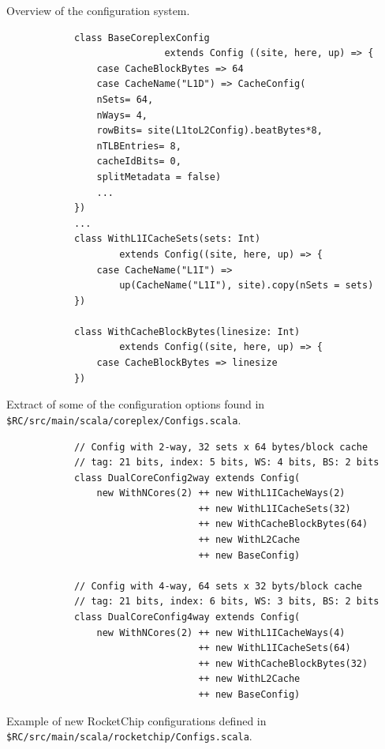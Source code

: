 \documentclass[journal,a4paper]{IEEEtran}
\begin{document}
\begin{table}
	\caption{Overview of the configuration system.}
	\begin{subtable}[b]{0.9\linewidth}
		\begin{verbatim}
			class BaseCoreplexConfig
							extends Config ((site, here, up) => {
				case CacheBlockBytes => 64
				case CacheName("L1D") => CacheConfig(
				nSets= 64,
				nWays= 4,
				rowBits= site(L1toL2Config).beatBytes*8,
				nTLBEntries= 8,
				cacheIdBits= 0,
				splitMetadata = false)
				...
			})
			...
			class WithL1ICacheSets(sets: Int)
					extends Config((site, here, up) => {
				case CacheName("L1I") =>
					up(CacheName("L1I"), site).copy(nSets = sets)
			})

			class WithCacheBlockBytes(linesize: Int)
					extends Config((site, here, up) => {
				case CacheBlockBytes => linesize
			})
		\end{verbatim}
		\caption{Extract of some of the configuration options found in \texttt{\$RC/src/main/scala/coreplex/Configs.scala}.}
		\label{config-options}
	\end{subtable}
	\begin{subtable}[b]{0.9\linewidth}
		\begin{verbatim}
			// Config with 2-way, 32 sets x 64 bytes/block cache
			// tag: 21 bits, index: 5 bits, WS: 4 bits, BS: 2 bits
			class DualCoreConfig2way extends Config(
				new WithNCores(2) ++ new WithL1ICacheWays(2)
				                  ++ new WithL1ICacheSets(32)
				                  ++ new WithCacheBlockBytes(64)
				                  ++ new WithL2Cache
				                  ++ new BaseConfig)

			// Config with 4-way, 64 sets x 32 byts/block cache
			// tag: 21 bits, index: 6 bits, WS: 3 bits, BS: 2 bits
			class DualCoreConfig4way extends Config(
				new WithNCores(2) ++ new WithL1ICacheWays(4)
				                  ++ new WithL1ICacheSets(64)
				                  ++ new WithCacheBlockBytes(32)
				                  ++ new WithL2Cache
				                  ++ new BaseConfig)
		\end{verbatim}
		\caption{Example of new RocketChip configurations defined in \texttt{\$RC/src/main/scala/rocketchip/Configs.scala}.}
		\label{new-configs}
	\end{subtable}
\end{table}
\end{document}
